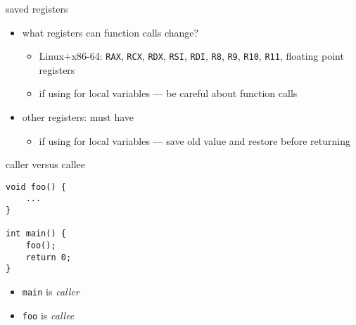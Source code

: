 \begin{frame}{saved registers}
\begin{itemize}
\item what registers can function calls change?
    \begin{itemize}
    \item Linux+x86-64: \texttt{RAX}, \texttt{RCX}, \texttt{RDX}, \texttt{RSI}, \texttt{RDI}, \texttt{R8}, \texttt{R9}, \texttt{R10}, \texttt{R11}, floating point registers
    \item if using for local variables --- be careful about function calls
    \end{itemize}
\item other registers: must have 
    \begin{itemize}
    \item if using for local variables --- save old value and restore before returning
    \end{itemize}
\end{itemize}
\end{frame}

\begin{frame}[fragile,label=callerVCallee]{caller versus callee}
\lstset{language=C++}
\begin{lstlisting}
void foo() {
    ...
}

int main() {
    foo();
    return 0;
}
\end{lstlisting}
\begin{itemize}
\item \texttt{main} is \textit{caller}
\item \texttt{foo} is \textit{callee}
\end{itemize}
\end{frame}
